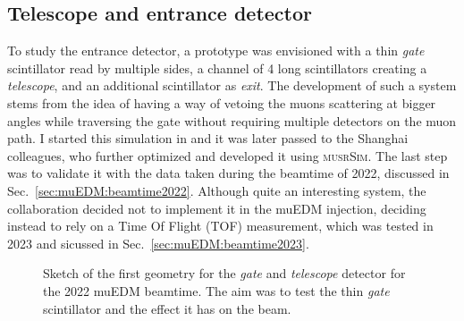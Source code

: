 \begin{refsection}
    \subsection{Telescope and entrance detector}
        To study the entrance detector, a prototype was envisioned with a thin \textit{gate} scintillator read by multiple sides, a channel of 4 long scintillators creating a \textit{telescope}, and an additional scintillator as \textit{exit}.
        The development of such a system stems from the idea of having a way of vetoing the muons scattering at bigger angles while traversing the gate without requiring multiple detectors on the muon path.
        I started this simulation in \gf and it was later passed to the Shanghai colleagues, who further optimized and developed it using \textsc{musrSim}.
        The last step was to validate it with the data taken during the beamtime of 2022, discussed in Sec.~\ref{sec:muEDM:beamtime2022}.
        Although quite an interesting system, the collaboration decided not to implement it in the muEDM injection, deciding instead to rely on a Time Of Flight (TOF) measurement, which was tested in 2023 and sicussed in Sec.~\ref{sec:muEDM:beamtime2023}.
        \begin{figure}   
            \centering
            \hfill
            \caption[muEDM: sketch if the \textit{telescope}]{Sketch of the first geometry for the \textit{gate} and \textit{telescope} detector for the 2022 muEDM beamtime. The aim was to test the thin \textit{gate} scintillator and the effect it has on the beam.}
            \label{fig:muEDM:entrance:sketches}
        \end{figure}
        

\end{refsection}
